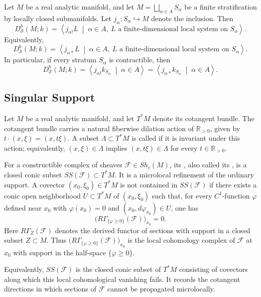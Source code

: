 {\begin{theorem}
Let \(M\) be a real analytic manifold, and let
\(M=\bigsqcup_{\alpha\in A}S_\alpha\) be a finite stratification by
locally closed submanifolds.  Let \(j_\alpha:S_\alpha\hookrightarrow M\)
denote the inclusion.  Then
\[
D^b_{\mathcal S}(M;k)
=
\left\langle
j_{\alpha !}L
\;\middle|\;
\alpha\in A,\ 
L \text{ a finite-dimensional local system on }S_\alpha
\right\rangle.
\]
Equivalently,
\[
D^b_{\mathcal S}(M;k)
=
\left\langle
j_{\alpha *}L
\;\middle|\;
\alpha\in A,\ 
L \text{ a finite-dimensional local system on }S_\alpha
\right\rangle.
\]
In particular, if every stratum \(S_\alpha\) is contractible, then
\[
D^b_{\mathcal S}(M;k)
=
\left\langle
j_{\alpha !}k_{S_\alpha}
\;\middle|\;
\alpha\in A
\right\rangle
=
\left\langle
j_{\alpha *}k_{S_\alpha}
\;\middle|\;
\alpha\in A
\right\rangle.
\]
\end{theorem}
\subsection{Singular Support}

Let \(M\) be a real analytic manifold, and let \(T^*M\) denote its
cotangent bundle.  The cotangent bundle carries a natural fiberwise
dilation action of \(\mathbb R_{>0}\), given by
\(t\cdot(x,\xi)=(x,t\xi)\).  A subset
\(\Lambda\subset T^*M\) is called \textbi{conic} if it is invariant
under this action; equivalently, \((x,\xi)\in\Lambda\) implies
\((x,t\xi)\in\Lambda\) for every \(t\in\mathbb R_{>0}\).

For a constructible complex of sheaves \(\mathcal F\in Sh_c(M)\), its
, also called its , is a
closed conic subset \(SS(\mathcal F)\subset T^*M\).  It is a microlocal
refinement of the ordinary support.  A covector
\((x_0,\xi_0)\in T^*M\) is not contained in \(SS(\mathcal F)\) if there
exists a conic open neighborhood \(U\subset T^*M\) of \((x_0,\xi_0)\)
such that, for every \(C^1\)-function \(\varphi\) defined near \(x_0\)
with \(\varphi(x_0)=0\) and \((x_0,d\varphi_{x_0})\in U\), one has
\[
\bigl(R\Gamma_{\{\varphi\geq 0\}}(\mathcal F)\bigr)_{x_0}=0.
\]
Here \(R\Gamma_Z(\mathcal F)\) denotes the derived functor of sections
with support in a closed subset \(Z\subset M\).  Thus
\(\bigl(R\Gamma_{\{\varphi\geq 0\}}(\mathcal F)\bigr)_{x_0}\) is the
local cohomology complex of \(\mathcal F\) at \(x_0\) with support in the
half-space \(\{\varphi\geq 0\}\).

Equivalently, \(SS(\mathcal F)\) is the closed conic subset of \(T^*M\)
consisting of covectors along which this local cohomological vanishing
fails.  It records the cotangent directions in which sections of
\(\mathcal F\) cannot be propagated microlocally.

}
